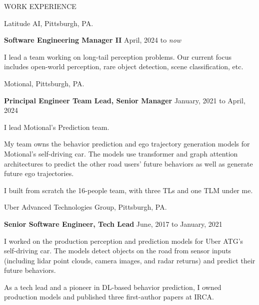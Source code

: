 \documentclass{resume} %
\begin{document}
\begin{rSection}{WORK EXPERIENCE}

\begin{rSubsection}{\hspace{-1em} Latitude AI, Pittsburgh, PA.}{}{}{}
\item[] \hspace{-2em} {\bf Software Engineering Manager II} \hfill April, 2024 to \emph{now}
\item I lead a team working on long-tail perception problems. Our current focus includes open-world perception, rare object detection, scene classification, etc.
\end{rSubsection}

\begin{rSubsection}{\hspace{-1em} Motional, Pittsburgh, PA.}{}{}{}
\item[] \hspace{-2em} {\bf Principal Engineer Team Lead, Senior Manager} \hfill January, 2021 to April, 2024
\item I lead Motional's Prediction team.
\item My team owns the behavior prediction and ego trajectory generation models for Motional's self-driving car. The models use transformer and graph attention architectures to predict the other road users' future behaviors as well as generate future ego trajectories.
\item I built from scratch the 16-people team, with three TLs and one TLM under me.
\end{rSubsection}

\begin{rSubsection}{\hspace{-1em} Uber Advanced Technologies Group, Pittsburgh, PA.}{}{}{}
\item[] \hspace{-2em} {\bf Senior Software Engineer, Tech Lead} \hfill June, 2017 to January, 2021
\item I worked on the production perception and prediction models for Uber ATG's self-driving car. The models detect objects on the road from sensor inputs (including lidar point clouds, camera images, and radar returns) and predict their future behaviors.
\item As a tech lead and a pioneer in DL-based behavior prediction, I owned production models and published three first-author papers at IRCA.
\end{rSubsection}
\end{rSection}
\end{document}
